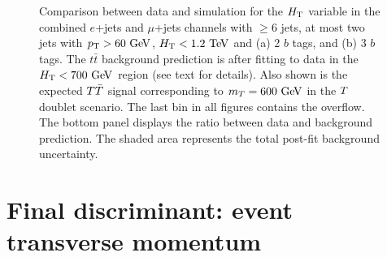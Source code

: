 \begin{figure}[htb]\begin{center}
	\caption{Comparison between data and simulation for the $\HT$ variable 
        in the combined
        $e$+jets and $\mu$+jets channels with $\geq 6$ jets, at most two jets with $\pt>60\gev$,
        $\HT<1.2\tev$ and (a) 2 $b$ tags, and (b) 3 $b$ tags.
        The $t\bar{t}$ background prediction is after fitting to data in the $\HT<700\gev$ region (see text for details).
        Also shown is the expected $\TT$ signal corresponding to $m_{\T}=600\gev$ in the $\T$ doublet scenario.
        The last bin in all figures contains the overflow. The bottom panel displays the ratio between data
        and background prediction. The shaded area represents the total post-fit background uncertainty.  
\label{fig:HT_signalregion_control}}
\end{center}\end{figure}


\section{Final discriminant: event transverse momentum}\label{sec:htxDISCR}

